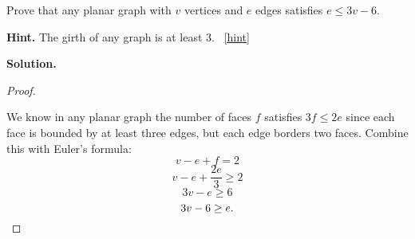 \documentclass{book}
\begin{document}
\setcounter{project}{30}
\addtocounter{project}{-1}
\begin{activity}[]\label{activity-25}
\hypertarget{p-311}{}%
Prove that any planar graph with \(v\) vertices and \(e\) edges satisfies \(e \le 3v - 6\).%
\par\smallskip%
\noindent\textbf{Hint.}\hypertarget{hint-9}{}\quad%
\hypertarget{p-312}{}%
The girth of any graph is at least 3.%
~\hfill{\tiny\hyperlink{a-30}{[hint]}\hypertarget{q-30}{}}\par\smallskip%
\noindent\textbf{Solution.}\hypertarget{solution-25}{}\quad%
\begin{proof}\hypertarget{proof-3}{}
\hypertarget{p-313}{}%
We know in any planar graph the number of faces \(f\) satisfies \(3f \le 2e\) since each face is bounded by at least three edges, but each edge borders two faces. Combine this with Euler's formula:%
\begin{equation*}
v - e + f = 2
\end{equation*}
%
\begin{equation*}
v - e + \frac{2e}{3} \ge 2
\end{equation*}
%
\begin{equation*}
3v - e \ge 6
\end{equation*}
%
\begin{equation*}
3v - 6 \ge e.\qedhere
\end{equation*}
%
\end{proof}
\end{activity}
\end{document}

